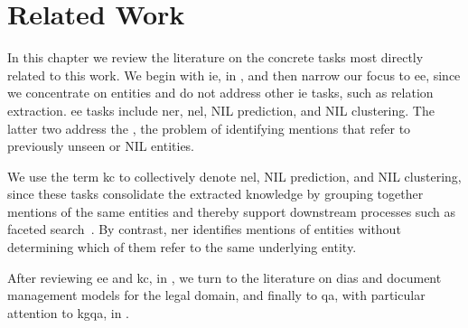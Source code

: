 \chapter{Related Work}
\label{chap:sota}

In this chapter we review the literature on the concrete tasks most directly related to this work. We begin with \acf{ie}, in , and then narrow our focus to \acf{ee}, since we concentrate on entities and do not address other \ac{ie} tasks, such as relation extraction. \Ac{ee} tasks include \acf{ner}, \acf{nel}, NIL prediction, and NIL clustering. The latter two address the \nilchallenge, \ie the problem of identifying mentions that refer to previously unseen or NIL entities.

We use the term \acf{kc} to collectively denote \ac{nel}, NIL prediction, and NIL clustering, since these tasks consolidate the extracted knowledge by grouping together mentions of the same entities and thereby support downstream processes such as faceted search~\cite{ARMENTANO2014_nlp_faceted,hearst_2006_faceted}. By contrast, \ac{ner} identifies mentions of entities without determining which of them refer to the same underlying entity.

After reviewing \ac{ee} and \ac{kc}, in , we turn to the literature on \aclp{dia} and document management models for the legal domain, and finally to \acf{qa}, with particular attention to \acf{kgqa}, in .

